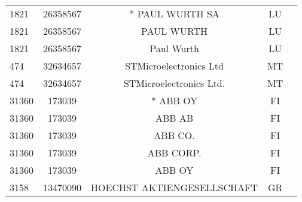 \begin{longtable}{|l|c|c|c|c|}
      1821 &   26358567 &                                    * PAUL WURTH SA &      LU \\
      1821 &   26358567 &                                         PAUL WURTH &      LU \\
      1821 &   26358567 &                                         Paul Wurth &      LU \\
       474 &   32634657 &                             STMicroelectronics Ltd &      MT \\
       474 &   32634657 &                            STMicroelectronics Ltd. &      MT \\
     31360 &     173039 &                                           * ABB OY &      FI \\
     31360 &     173039 &                                             ABB AB &      FI \\
     31360 &     173039 &                                            ABB CO. &      FI \\
     31360 &     173039 &                                          ABB CORP. &      FI \\
     31360 &     173039 &                                             ABB OY &      FI \\
      3158 &   13470090 &                         HOECHST AKTIENGESELLSCHAFT &      GR \\
\hline
\end{longtable}
